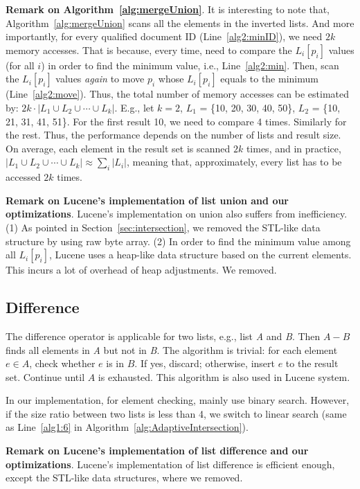 \textbf{Remark on Algorithm~\ref{alg:mergeUnion}}. It is interesting to note that, Algorithm~\ref{alg:mergeUnion} scans all the elements in the inverted lists. And more importantly, for every qualified document ID (Line~\ref{alg2:minID}), we need $2k$ memory accesses. That is because, every time, need to compare the $L_i[p_i]$ values (for all $i$) in order to find the minimum value, i.e., Line~\ref{alg2:min}. Then, scan the $L_i[p_i]$ values \emph{again} to move $p_i$ whose $L_i[p_i]$ equals to the minimum (Line~\ref{alg2:move}). Thus, the total number of memory accesses can be estimated by: $2k\cdot |L_1 \cup L_2 \cup \cdots \cup L_k|$. E.g., let $k=2$, $L_1$ = \{10, 20, 30, 40, 50\}, $L_2$ = \{10, 21, 31, 41, 51\}. For the first result 10, we need to compare 4 times. Similarly for the rest.
Thus, the performance depends on the number of lists and result size. On average, each element in the result set is scanned $2k$ times, and in practice, $|L_1 \cup L_2 \cup \cdots \cup L_k| \approx \sum_i|L_i|$, meaning that, approximately, every list has to be accessed $2k$ times.

\textbf{Remark on Lucene's implementation of list union and our optimizations}. Lucene's implementation on union also suffers from inefficiency. (1) As pointed in Section~\ref{sec:intersection}, we removed the STL-like data structure by using raw byte array. (2) In order to find the minimum value among all $L_i[p_i]$, Lucene uses a heap-like data structure based on the current elements. This incurs a lot of overhead of heap adjustments. We removed.

\subsection{Difference}\label{sec:difference}
The difference operator is applicable for two lists, e.g., list \emph{A} and \emph{B}. Then $A-B$ finds all elements in \emph{A} but not in \emph{B}. The algorithm is trivial: for each element $e\in A$, check whether $e$ is in $B$. If yes, discard; otherwise, insert $e$ to the result set. Continue until $A$ is exhausted. This algorithm is also used in Lucene system.

In our implementation, for element checking, mainly use binary search. However, if the size ratio between two lists is less than 4, we switch to linear search (same as Line~\ref{alg1:6} in Algorithm~\ref{alg:AdaptiveIntersection}).


\textbf{Remark on Lucene's implementation of list difference and our optimizations}. Lucene's implementation of list difference is efficient enough, except the STL-like data structures, where we removed.

